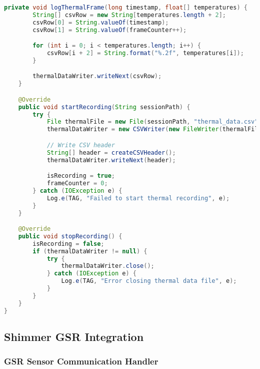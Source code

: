 \begin{lstlisting}[language=Java, caption=Thermal Camera Integration Implementation]
    private void logThermalFrame(long timestamp, float[] temperatures) {
        String[] csvRow = new String[temperatures.length + 2];
        csvRow[0] = String.valueOf(timestamp);
        csvRow[1] = String.valueOf(frameCounter++);

        for (int i = 0; i < temperatures.length; i++) {
            csvRow[i + 2] = String.format("%.2f", temperatures[i]);
        }

        thermalDataWriter.writeNext(csvRow);
    }

    @Override
    public void startRecording(String sessionPath) {
        try {
            File thermalFile = new File(sessionPath, "thermal_data.csv");
            thermalDataWriter = new CSVWriter(new FileWriter(thermalFile));

            // Write CSV header
            String[] header = createCSVHeader();
            thermalDataWriter.writeNext(header);

            isRecording = true;
            frameCounter = 0;
        } catch (IOException e) {
            Log.e(TAG, "Failed to start thermal recording", e);
        }
    }

    @Override
    public void stopRecording() {
        isRecording = false;
        if (thermalDataWriter != null) {
            try {
                thermalDataWriter.close();
            } catch (IOException e) {
                Log.e(TAG, "Error closing thermal data file", e);
            }
        }
    }
}
\end{lstlisting}

\subsection{Shimmer GSR Integration}

\subsubsection{GSR Sensor Communication Handler}

